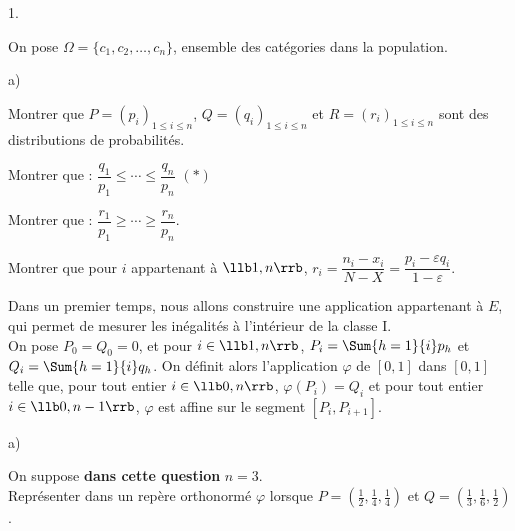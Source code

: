 \begin{noliste}{1.}
 \setlength{\itemsep}{4mm}
 \setcounter{enumi}{9}
 \item On pose $\Omega=\{c_1,c_2, \ldots ,c_n\}$, ensemble des 
 catégories dans la population.
 \begin{noliste}{a)}
  \setlength{\itemsep}{2mm}
  \item Montrer que $P=(p_i)_{1 \leq i \leq n}$, $Q= (q_i)_{1 \leq i 
  \leq n}$ et $R= (r_i)_{1 \leq i \leq n}$ sont des distributions de 
  probabilités.
  
  
  
  
  

  
  \item Montrer que : $\dfrac{q_1}{p_1} \leq \cdots \leq 
  \dfrac{q_n}{p_n}$ $(\ast)$
  
  
  
  \item Montrer que : $\dfrac{r_1}{p_1} \geq \cdots \geq 
  \dfrac{r_n}{p_n}$.
  
  

  
  \item Montrer que pour $i$ appartenant à $\llb 1,n \rrb$, $r_i= 
  \dfrac{n_i-x_i}{N-X}= \dfrac{p_i-\varepsilon q_i}{1- \varepsilon}$. 
  
  
 \end{noliste}
 
 
 
 
 
 
 \item Dans un premier temps, nous allons construire une application 
 appartenant à $E$, qui permet de mesurer les inégalités à l'intérieur 
 de la classe I.\\
 On pose $P_0=Q_0=0$, et pour $i \in \llb 1,n \rrb$, $P_i= \Sum{h=1}{i} 
 p_h$ et $Q_i=\Sum{h=1}{i} q_h$. On définit alors l'application 
 $\varphi$ de $[0,1]$ dans $[0,1]$ telle que, pour tout entier $i \in 
 \llb 0,n \rrb$, $\varphi(P_i)=Q_i$ et pour tout entier $i \in \llb 
 0,n-1 \rrb$, $\varphi$ est affine sur le segment $[P_i, P_{i+1}]$. 
 \begin{noliste}{a)}
  \setlength{\itemsep}{2mm}
  \item On suppose \textbf{dans cette question} $n=3$.\\
  Représenter dans un repère orthonormé $\varphi$ lorsque $P= \left( 
  \frac{1}{2}, \frac{1}{4}, \frac{1}{4} \right)$ et $Q=\left( 
  \frac{1}{3}, \frac{1}{6}, \frac{1}{2}  \right)$. 
  

\end{noliste}
\end{noliste}
